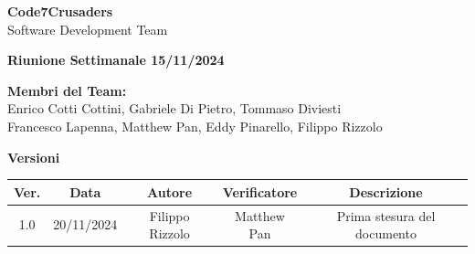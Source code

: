 \documentclass{article}
\begin{document}
\begin{titlepage}
    {\Huge \textbf{Code7Crusaders}}\\
    \vspace{0.5cm}
    {\Large Software Development Team}\\
    \vspace{2cm}
    
    {\large \textbf{Riunione Settimanale 15/11/2024}}\\
    \vspace{5cm}

    \textbf{Membri del Team:}\\
    Enrico Cotti Cottini, Gabriele Di Pietro, Tommaso Diviesti \\
    Francesco Lapenna, Matthew Pan, Eddy Pinarello, Filippo Rizzolo \\
    \vspace{0.5cm}
    
    \vspace{1cm}
\end{titlepage}

\newpage
\begin{table}[h!]
\centering
\textbf{Versioni} \\ %
\vspace{2mm} %
\begin{tabular}{|c|c|c|c|c|}
    \hline
    \textbf{Ver.} & \textbf{Data} & \textbf{Autore} & \textbf{Verificatore} & \textbf{Descrizione} \\
    \hline
    1.0 & 20/11/2024 & Filippo Rizzolo & Matthew Pan & Prima stesura del documento \\ 
    \hline
\end{tabular}
\end{table}

\newpage
\tableofcontents

\newpage
\end{document}
